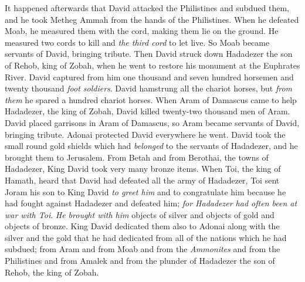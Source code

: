 \begin{biblechapter} %
 It happened afterwards that David attacked the Philistines and subdued them, and he took Metheg Ammah from the hands of the Philistines.
\verse When he defeated Moab, he measured them with the cord, making them lie on the ground. He measured two cords to kill and \textit{the third cord} to let live. So Moab became servants of David, bringing tribute.
\verse Then David struck down Hadadezer the son of Rehob, king of Zobah, when he went to restore his monument at the Euphrates River.
\verse David captured from him one thousand and seven hundred horsemen and twenty thousand \textit{foot soldiers}. David hamstrung all the chariot horses, but \textit{from them} he spared a hundred chariot horses.
\verse When Aram of Damascus came to help Hadadezer, the king of Zobah, David killed twenty-two thousand men of Aram.
\verse David placed garrisons in Aram of Damascus, so Aram became servants of David, bringing tribute. Adonai protected David everywhere he went.
\verse David took the small round gold shields which had \textit{belonged} to the servants of Hadadezer, and he brought them to Jerusalem.
\verse From Betah and from Berothai, the towns of Hadadezer, King David took very many bronze items.
\verse When Toi, the king of Hamath, heard that David had defeated all the army of Hadadezer,
\verse Toi sent Joram his son to King David \textit{to greet him} and to congratulate him because he had fought against Hadadezer and defeated him; \textit{for Hadadezer had often been at war with Toi}. \textit{He brought with him} objects of silver and objects of gold and objects of bronze.
\verse King David dedicated them also to Adonai along with the silver and the gold that he had dedicated from all of the nations which he had subdued;
\verse from Aram and from Moab and from the \textit{Ammonites} and from the Philistines and from Amalek and from the plunder of Hadadezer the son of Rehob, the king of Zobah.

\end{biblechapter}

